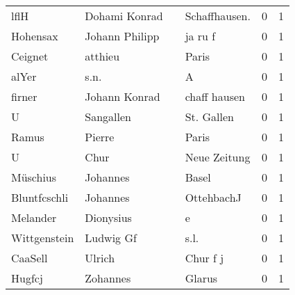 \begin{center}
\begin{tiny}
\begin{longtabu}{llllrr}
                     lflH &                      Dohami Konrad &             &                              Schaffhausen.  &          0 &         1 \\
                 Hohensax &                     Johann Philipp &             &                                     ja ru f &          0 &         1 \\
                  Ceignet &                            atthieu &             &                                       Paris &          0 &         1 \\
                    alYer &                               s.n. &             &                                           A &          0 &         1 \\
                   firner &                      Johann Konrad &             &                                chaff hausen &          0 &         1 \\
                        U &                          Sangallen &             &                                  St. Gallen &          0 &         1 \\
                    Ramus &                             Pierre &             &                                       Paris &          0 &         1 \\
                        U &                               Chur &             &                                Neue Zeitung &          0 &         1 \\
                 Müschius &                           Johannes &             &                                       Basel &          0 &         1 \\
             Bluntfcschli &                           Johannes &             &                                  OttehbachJ &          0 &         1 \\
                 Melander &                          Dionysius &             &                                           e &          0 &         1 \\
             Wittgenstein &                          Ludwig Gf &             &                                        s.l. &          0 &         1 \\
                  CaaSell &                             Ulrich &             &                                    Chur f j &          0 &         1 \\
                   Hugfcj &                           Zohannes &             &                                      Glarus &          0 &         1 \\

\end{longtabu}
\end{tiny}
\end{center}
